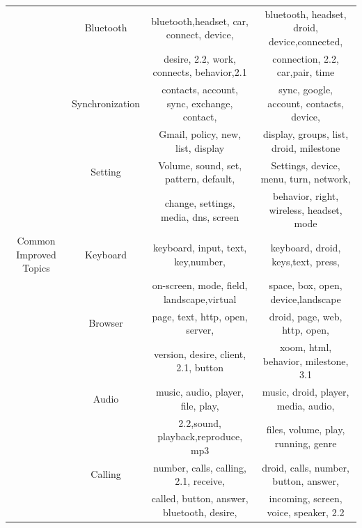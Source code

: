 \documentclass[10pt, conference, compsocconf]{IEEEtran}
\begin{document}
\begin{table}[!htb]
\begin{tabular}{|c||c||c||c|}
  & Bluetooth & bluetooth,headset, car, connect, device,  &bluetooth,	headset, droid, device,connected, \\
            &&desire,	2.2, work, connects, behavior,2.1 &connection, 2.2, car,pair, time\\ \cline{2-4}
            
  & Synchronization&contacts, account, sync, exchange, contact, &sync, google, account, contacts, device, \\
            &&Gmail, policy, new, list, display&display, groups,  list,  droid, milestone\\ \cline{2-4}
            
  & Setting&Volume, sound,	set, pattern,  default,&Settings, device, menu, turn,	network, \\
            && change, settings, media, dns, screen &behavior,	right, wireless, headset, mode\\
\hline

Common Improved Topics & Keyboard &keyboard, input,	text, key,number,&keyboard, droid, keys,text, press, \\
           && on-screen, mode, field,
landscape,virtual &space, box, open, device,landscape\\ \cline{2-4}
           
    &Browser& page, text, http, open, server,&droid, page, web, http, open, \\
           && version, desire, client, 2.1, button  &xoom, html, behavior, milestone, 3.1 \\ \cline{2-4}
           
               &Audio& music, audio, player, file, play, &music, droid, player, media, audio,  \\
           &&2.2,sound, playback,reproduce, mp3 &files, volume, play, running, genre\\ \cline{2-4}
           
               &Calling& number, calls, calling, 2.1, receive, &droid, calls, number, button, answer,  \\
           && called, button, answer, bluetooth, desire,  &incoming, screen, voice, speaker, 2.2 \\ \cline{2-4}
           

\end{tabular}
\end{table}
\end{document}

